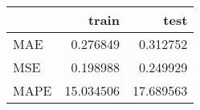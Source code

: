 \begin{tabular}{lrr}
\toprule
{} &      train &       test \\
\midrule
MAE  &   0.276849 &   0.312752 \\
MSE  &   0.198988 &   0.249929 \\
MAPE &  15.034506 &  17.689563 \\
\bottomrule
\end{tabular}

